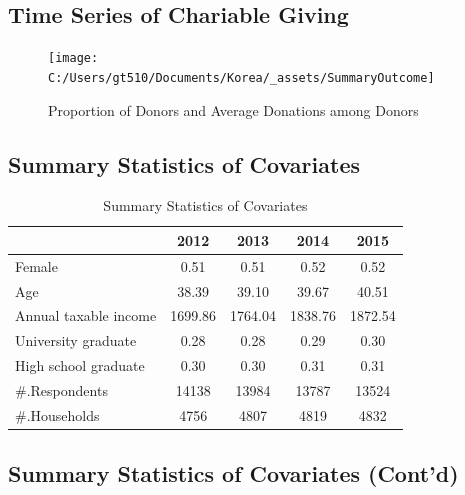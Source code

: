 \documentclass[ review  , 3p ]{elsarticle}
\begin{document}
  \hypertarget{time-series-of-chariable-giving}{%
  \subsection{Time Series of Chariable Giving}\label{time-series-of-chariable-giving}}
  
  \begin{figure}
  
  {\centering \texttt{[image: C:/Users/gt510/Documents/Korea/\_assets/SummaryOutcome]} 
  
  }
  
  \caption{Proportion of Donors and Average Donations among Donors}\label{fig:unnamed-chunk-1}
  \end{figure}
  
  \hypertarget{summary-statistics-of-covariates}{%
  \subsection{Summary Statistics of Covariates}\label{summary-statistics-of-covariates}}
  
  \begin{table}
  
  \caption{\label{tab:kableSummaryCovariate}Summary Statistics of Covariates}
  \centering
  \begin{tabular}[t]{lcccc}
  \toprule
   & 2012 & 2013 & 2014 & 2015\\
  \midrule
  Female & 0.51 & 0.51 & 0.52 & 0.52\\
  Age & 38.39 & 39.10 & 39.67 & 40.51\\
  Annual taxable income & 1699.86 & 1764.04 & 1838.76 & 1872.54\\
  University graduate & 0.28 & 0.28 & 0.29 & 0.30\\
  High school graduate & 0.30 & 0.30 & 0.31 & 0.31\\
  \#.Respondents & 14138 & 13984 & 13787 & 13524\\
  \#.Households & 4756 & 4807 & 4819 & 4832\\
  \bottomrule
  \end{tabular}
  \end{table}
  
  \hypertarget{summary-statistics-of-covariates-contd}{%
  \subsection{Summary Statistics of Covariates (Cont'd)}\label{summary-statistics-of-covariates-contd}}
  
\end{document}
